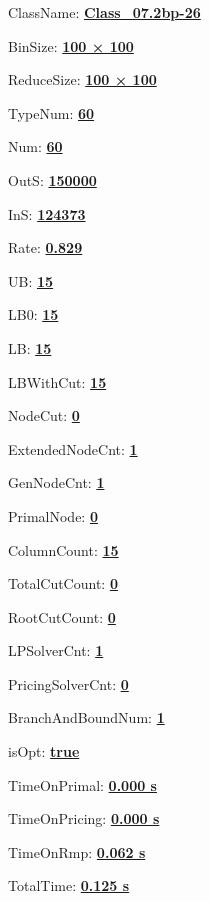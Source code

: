 \documentclass[11pt]{article}
\begin{document}
\pagestyle{empty}


ClassName: \underline{\textbf{Class_07.2bp-26}}
\par
BinSize: \underline{\textbf{100 × 100}}
\par
ReduceSize: \underline{\textbf{100 × 100}}
\par
TypeNum: \underline{\textbf{60}}
\par
Num: \underline{\textbf{60}}
\par
OutS: \underline{\textbf{150000}}
\par
InS: \underline{\textbf{124373}}
\par
Rate: \underline{\textbf{0.829}}
\par
UB: \underline{\textbf{15}}
\par
LB0: \underline{\textbf{15}}
\par
LB: \underline{\textbf{15}}
\par
LBWithCut: \underline{\textbf{15}}
\par
NodeCut: \underline{\textbf{0}}
\par
ExtendedNodeCnt: \underline{\textbf{1}}
\par
GenNodeCnt: \underline{\textbf{1}}
\par
PrimalNode: \underline{\textbf{0}}
\par
ColumnCount: \underline{\textbf{15}}
\par
TotalCutCount: \underline{\textbf{0}}
\par
RootCutCount: \underline{\textbf{0}}
\par
LPSolverCnt: \underline{\textbf{1}}
\par
PricingSolverCnt: \underline{\textbf{0}}
\par
BranchAndBoundNum: \underline{\textbf{1}}
\par
isOpt: \underline{\textbf{true}}
\par
TimeOnPrimal: \underline{\textbf{0.000 s}}
\par
TimeOnPricing: \underline{\textbf{0.000 s}}
\par
TimeOnRmp: \underline{\textbf{0.062 s}}
\par
TotalTime: \underline{\textbf{0.125 s}}
\par
\newpage


\end{document}
